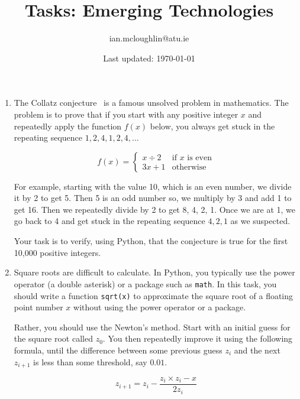 \documentclass{iansnotes}
\title{Tasks: Emerging Technologies}
\author{ian.mcloughlin@atu.ie}
\date{Last updated: \today}
\begin{document}
 
\maketitle
 
\begin{enumerate}
  \item The Collatz conjecture~\autocite{quantacollatz} is a famous unsolved problem in mathematics. The problem is to prove that if you start with any positive integer $x$ and repeatedly apply the function $f(x)$ below, you always get stuck in the repeating sequence $1,2,4,1,2,4,\ldots$ 
  
  $$ f(x) = \begin{cases}
    x \div 2 & \text{if } x \text{ is even} \\
    3x + 1              & \text{otherwise} 
  \end{cases}$$

  For example, starting with the value 10, which is an even number, we divide it by 2 to get 5.
  Then 5 is an odd number so, we multiply by 3 and add 1 to get 16.
  Then we repeatedly divide by 2 to get 8, 4, 2, 1.
  Once we are at 1, we go back to 4 and get stuck in the repeating sequence $4, 2, 1$ as we suspected.

  Your task is to verify, using Python, that the conjecture is true for the first 10,000 positive integers.
  
  \item Square roots are difficult to calculate. In Python, you typically use the power operator (a double asterisk) or a package such as \texttt{math}. In this task\autocite{golangnewton}, you should write a function \texttt{sqrt(x)} to approximate the square root of a floating point number $x$ without using the power operator or a package.
  
  Rather, you should use the Newton's method\autocite{newtonsqrt}. Start with an initial guess for the square root called $z_0$. You then repeatedly improve it using the following formula, until the difference between some previous guess $z_i$ and the next $z_{i+1}$ is less than some threshold, say $0.01$.
  
  $$ z_{i+1} = z_i -  \frac{z_i \times z_i - x}{2 z_i}$$

\end{enumerate}
\end{document}
